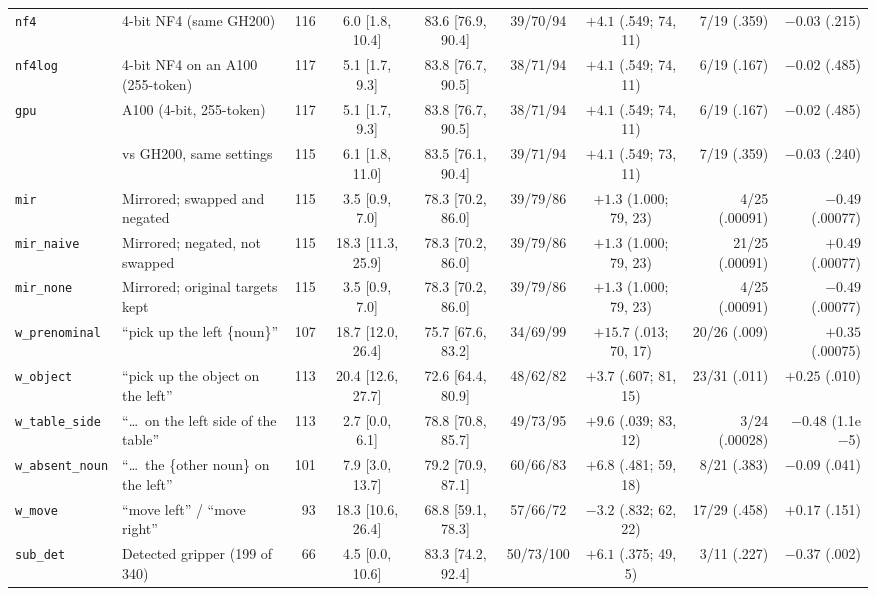 \documentclass[conference]{IEEEtran}
\newcommand{\rowid}[1]{\texttt{#1}}
\begin{document}
\begin{table}[t]
\begin{tabular}{@{}l L{3.5cm} r c c c c r r@{}}
\rowid{nf4} & 4-bit NF4 (same GH200) & 116 & 6.0 [1.8, 10.4] & 83.6 [76.9, 90.4] & 39/70/94 & $+4.1$ (.549; 74, 11) & 7/19 (.359) & $-0.03$ (.215)\\
\rowid{nf4log} & 4-bit NF4 on an A100 (255-token) & 117 & 5.1 [1.7, 9.3] & 83.8 [76.7, 90.5] & 38/71/94 & $+4.1$ (.549; 74, 11) & 6/19 (.167) & $-0.02$ (.485)\\
\rowid{gpu} & A100 (4-bit, 255-token) & 117 & 5.1 [1.7, 9.3] & 83.8 [76.7, 90.5] & 38/71/94 & $+4.1$ (.549; 74, 11) & 6/19 (.167) & $-0.02$ (.485)\\
 & \quad vs GH200, same settings & 115 & 6.1 [1.8, 11.0] & 83.5 [76.1, 90.4] & 39/71/94 & $+4.1$ (.549; 73, 11) & 7/19 (.359) & $-0.03$ (.240)\\
\rowid{mir} & Mirrored; swapped and negated & 115 & 3.5 [0.9, 7.0] & 78.3 [70.2, 86.0] & 39/79/86 & $+1.3$ (1.000; 79, 23) & 4/25 (.00091) & $-0.49$ (.00077)\\
\rowid{mir\_naive} & Mirrored; negated, not swapped & 115 & 18.3 [11.3, 25.9] & 78.3 [70.2, 86.0] & 39/79/86 & $+1.3$ (1.000; 79, 23) & 21/25 (.00091) & $+0.49$ (.00077)\\
\rowid{mir\_none} & Mirrored; original targets kept & 115 & 3.5 [0.9, 7.0] & 78.3 [70.2, 86.0] & 39/79/86 & $+1.3$ (1.000; 79, 23) & 4/25 (.00091) & $-0.49$ (.00077)\\
\rowid{w\_prenominal} & ``pick up the left \{noun\}'' & 107 & 18.7 [12.0, 26.4] & 75.7 [67.6, 83.2] & 34/69/99 & $+15.7$ (.013; 70, 17) & 20/26 (.009) & $+0.35$ (.00075)\\
\rowid{w\_object} & ``pick up the object on the left'' & 113 & 20.4 [12.6, 27.7] & 72.6 [64.4, 80.9] & 48/62/82 & $+3.7$ (.607; 81, 15) & 23/31 (.011) & $+0.25$ (.010)\\
\rowid{w\_table\_side} & ``\dots\ on the left side of the table'' & 113 & 2.7 [0.0, 6.1] & 78.8 [70.8, 85.7] & 49/73/95 & $+9.6$ (.039; 83, 12) & 3/24 (.00028) & $-0.48$ (1.1e$-$5)\\
\rowid{w\_absent\_noun} & ``\dots\ the \{other noun\} on the left'' & 101 & 7.9 [3.0, 13.7] & 79.2 [70.9, 87.1] & 60/66/83 & $+6.8$ (.481; 59, 18) & 8/21 (.383) & $-0.09$ (.041)\\
\rowid{w\_move} & ``move left'' / ``move right'' & 93 & 18.3 [10.6, 26.4] & 68.8 [59.1, 78.3] & 57/66/72 & $-3.2$ (.832; 62, 22) & 17/29 (.458) & $+0.17$ (.151)\\
\rowid{sub\_det} & Detected gripper (199 of 340) & 66 & 4.5 [0.0, 10.6] & 83.3 [74.2, 92.4] & 50/73/100 & $+6.1$ (.375; 49, 5) & 3/11 (.227) & $-0.37$ (.002)\\

\end{tabular}
\end{table}
\end{document}
